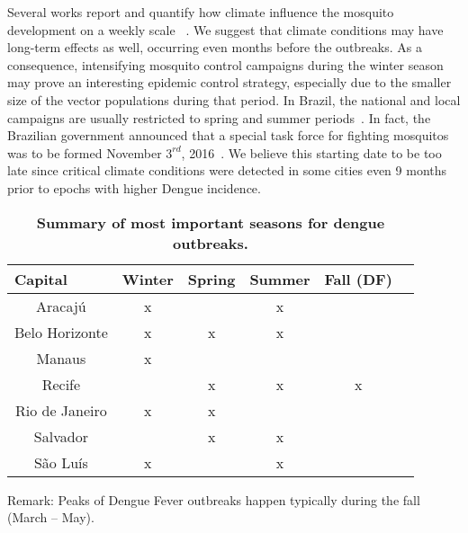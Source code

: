 \documentclass[final,leqno]{siamltexmm2}
\begin{document}
Several works report and quantify how climate influence the mosquito development on a weekly scale 
~\cite{Pessanha,Honorio2009,Dibo}. We suggest that climate conditions may have long-term effects as well, 
occurring even months before the outbreaks. As a consequence, intensifying mosquito control campaigns 
during the winter season may prove an interesting epidemic control strategy, especially due to the smaller size
of the vector populations during that period. In Brazil, the national and local campaigns are usually restricted to spring 
and summer periods~\cite{dengue2014,dengue2016}. In fact, the Brazilian government announced that a 
special task force for fighting mosquitos was to be formed November $3^{rd}$, 2016~\cite{dengue2017}. We believe
this starting date to be too late since critical climate conditions were detected in some cities even 9 months prior 
to epochs with higher Dengue incidence. 
%
%
%
\begin{table}[!t]
\centering
\caption{
{\bf Summary of most important seasons  for dengue outbreaks.}}
\begin{tabular}{|c|c|c|c|c|c|}
\hline
\multicolumn{1}{|l|}{\bf Capital} & \multicolumn{1}{|l|}{\bf Winter } & \multicolumn{1}{|l|}{\bf Spring }&\multicolumn{1}{|l|}{\bf Summer }&\multicolumn{1}{|l|}{\bf Fall (DF)  }\\ \hline %
 Aracajú &  x &  &x&      \\ \hline
Belo Horizonte  &  x&x  &x&       \\ \hline
Manaus  &x   &  & &     \\ \hline
Recife  &   &x  &x  &x      \\ \hline
Rio de Janeiro  & x  & x & &      \\ \hline
Salvador  &   &x  &x &      \\ \hline
São Luís  &x   &  &x &      \\ \hline
\end{tabular}
\begin{flushleft} 
\small{Remark: Peaks of Dengue Fever outbreaks happen typically during the fall (March -- May).}
\end{flushleft}
\label{table1}
\end{table}
%
%
\end{document}
